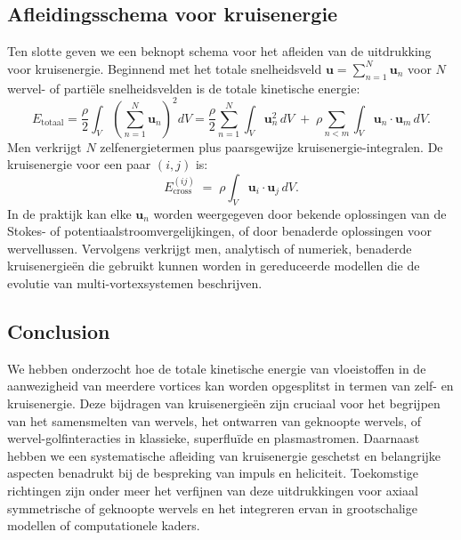 \subsection{Afleidingsschema voor kruisenergie}
\label{sec:derivation}
Ten slotte geven we een beknopt schema voor het afleiden van de uitdrukking voor kruisenergie. Beginnend met het totale snelheidsveld $\mathbf{u} = \sum_{n=1}^N \mathbf{u}_n$
voor $N$ wervel- of partiële snelheidsvelden is de totale kinetische energie:
\begin{equation}
E_{\text{totaal}}
= \frac{\rho}{2} \int_V \left(\sum_{n=1}^N \mathbf{u}_n \right)^2 dV
= \frac{\rho}{2} \sum_{n=1}^N \int_V \mathbf{u}_n^2 \, dV
\;+\;\rho \sum_{n<m} \int_V \mathbf{u}_n \cdot \mathbf{u}_m \, dV.\label{eq:appendix:total-energy-derivation}
\end{equation}
Men verkrijgt $N$ zelfenergietermen plus paarsgewijze kruisenergie-integralen.
De kruisenergie voor een paar $(i,j)$ is:
\begin{equation}
E_{\text{cross}}^{(ij)} \;=\; \rho \int_V \mathbf{u}_i \cdot \mathbf{u}_j \, dV.\label{eq:appendix:cross-energy-derivation}
\end{equation}
In de praktijk kan elke $\mathbf{u}_n$ worden weergegeven door bekende oplossingen van de
Stokes- of potentiaalstroomvergelijkingen, of door benaderde oplossingen voor wervellussen. Vervolgens verkrijgt men, analytisch of numeriek, benaderde kruisenergieën
die gebruikt kunnen worden in gereduceerde modellen die de evolutie van multi-vortexsystemen beschrijven.

\subsection*{Conclusion}
We hebben onderzocht hoe de totale kinetische energie van vloeistoffen in de aanwezigheid van meerdere
vortices kan worden opgesplitst in termen van zelf- en kruisenergie. Deze bijdragen van kruisenergieën
zijn cruciaal voor het begrijpen van het samensmelten van wervels, het ontwarren van geknoopte wervels, of wervel-golfinteracties in klassieke, superfluïde en plasmastromen. Daarnaast hebben we een systematische afleiding van kruisenergie geschetst en
belangrijke aspecten benadrukt bij de bespreking van impuls en heliciteit. Toekomstige richtingen
zijn onder meer het verfijnen van deze uitdrukkingen voor axiaal symmetrische of geknoopte wervels en
het integreren ervan in grootschalige modellen of computationele kaders.
